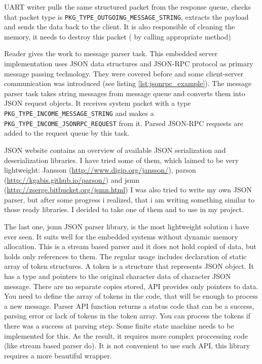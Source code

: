 UART writer pulls the same structured packet from the response queue, checks
that packet type is \texttt{PKG\_TYPE\_OUTGOING\_MESSAGE\_STRING}, extracts the
payload and sends the data back to the client. It is also responsible of
cleaning the memory, it needs to destroy this packet ( by calling appropriate
method)

Reader gives the work to message parser task.
This embedded server implementation uses 
JSON data structures and JSON-RPC protocol  as primary  message passing technology.
They were covered before and some client-server communication was introduced (see listing \ref{lst:jsonrpc_example}). 
The message parser task takes string messages from message queue and converts them into JSON request objects. 
It receives system packet with a type \texttt{PKG\_TYPE\_INCOME\_MESSAGE\_STRING} and makes a \texttt{PKG\_TYPE\_INCOME\_JSONRPC\_REQUEST}  from it.
Parsed JSON-RPC requests are added to the request queue by this task.

JSON website \cite{json_org} contains an overview of available JSON serialization and deserialization libraries.
I have tried some of them, which laimed to be very lightweight: Jansson (\url{http://www.digip.org/jansson/}), parson (\url{http://kgabis.github.io/parson/}) and jsmn (\url{http://zserge.bitbucket.org/jsmn.html})
I was also tried to write my own JSON parser, but after some progress i realized, that i am writing something similar to those ready libraries.
I decided to take one of them and to use in my project.

The last one, jsmn JSON parser library, is the most lightweight solution i have ever seen.
It suits well for the embedded systems without dynamic  memory allocation. 
This is a stream based parser and it does not hold copied of data, but holds only references to them.
The regular usage includes declaration of static array of token structures. 
A token is a structure that represents JSON object. 
It has a type and pointers to the original character data of character JSON message.
There are no separate copies stored, API provides only pointers to data.
You need to define the array of tokens in the code, that will be enough to process a new message. 
Parser API function returns a status code that can be a success, parsing error or lack of tokens in the token array.
You can process the tokens if there was a success at parsing step.
Some finite state machine needs to be implemented for this. As the result, it requires more complex proccessing code (like stream based parser do).
It is not convenient to use such API, this library requires a more beautiful wrapper.


